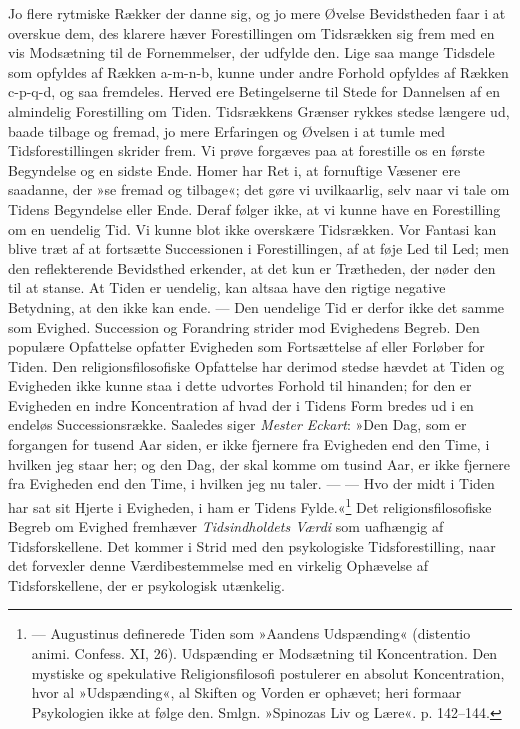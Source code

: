 \documentclass[12pt,a4paper,openany]{book}
\newcommand{\opage}[1]{\marginnote{\footnotesize\textit{[#1]}}}
\begin{document}
Jo flere rytmiske Rækker der danne sig, og jo mere Øvelse Bevidstheden
faar i at overskue dem, des klarere hæver Forestillingen om Tidsrækken
sig frem med en vis Modsætning til de Fornemmelser, der udfylde den.
Lige saa mange Tidsdele som opfyldes af Rækken a-m-n-b, kunne under
andre Forhold opfyldes af Rækken c-p-q-d, og saa fremdeles. Herved ere
Betingelserne til Stede for Dannelsen af en almindelig Forestilling om
Tiden. Tidsrækkens Grænser rykkes stedse længere ud, baade tilbage og
fremad, jo mere Erfaringen og Øvelsen i at tumle med Tidsforestillingen
skrider frem. Vi prøve forgæves paa at forestille os en første
Begyndelse og en sidste Ende. Homer har Ret i, at fornuftige Væsener ere
saadanne, der »se fremad og tilbage«; det gøre vi uvilkaarlig, selv naar
vi tale om Tidens Begyndelse eller Ende. Deraf følger ikke, at vi kunne
have en Forestilling om en uendelig Tid. Vi kunne blot ikke overskære
Tidsrækken. Vor Fantasi kan blive træt af at fortsætte Successionen i
Forestillingen, af at føje Led til Led; men den reflekterende Bevidsthed
erkender, at det kun er Trætheden, der nøder den til at stanse. At Tiden
er uendelig, kan altsaa have den rigtige negative Betydning, at den ikke
kan ende. --- Den uendelige Tid er derfor ikke det samme som Evighed.
Succession og Forandring strider mod Evighedens Begreb. Den populære
Opfattelse opfatter Evigheden som Fortsættelse af eller Forløber for
Tiden. Den religionsfilosofiske Opfattelse har derimod stedse hævdet at
Tiden og Evigheden ikke kunne staa i dette udvortes Forhold til
hinanden; for den er Evigheden en indre Koncentration af hvad der i
Tidens Form bredes ud i en endeløs Successionsrække. Saaledes siger
\emph{Mester Eckart}: »Den Dag, som er forgangen for tusend Aar siden,
er ikke fjernere fra Evigheden end den Time, i hvilken jeg staar her; og
den Dag, der skal komme om tusind Aar, er ikke fjernere fra Evigheden
end den Time, i hvilken jeg nu taler. --- --- Hvo der midt i Tiden har
sat sit Hjerte i Evigheden, i ham er Tidens Fylde.«\footnote[1]{---
Augustinus definerede Tiden som »Aandens Udspænding« (distentio animi.
Confess. XI, 26). Udspænding er Modsætning til Koncentration. Den
mystiske og spekulative Religionsfilosofi postulerer en absolut
Koncentration, hvor al »Udspænding«, al Skiften og Vorden er ophævet;
heri formaar Psykologien ikke at følge den. Smlgn. »Spinozas Liv og
Lære«. p. 142--144.} Det
\opage{230}religionsfilosofiske Begreb om Evighed fremhæver
\emph{Tidsindholdets Værdi} som uafhængig af Tidsforskellene. Det kommer
i Strid med den psykologiske Tidsforestilling, naar det forvexler denne
Værdibestemmelse med en virkelig Ophævelse af Tidsforskellene, der er
psykologisk utænkelig.
\end{document}

